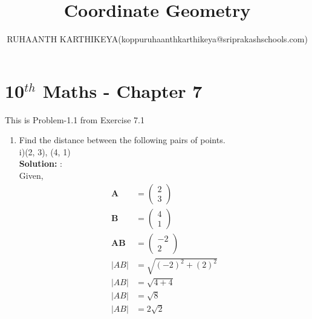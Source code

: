 \documentclass[12pt]{article}
\title{Coordinate Geometry}
\author{RUHAANTH KARTHIKEYA(koppuruhaanthkarthikeya@sriprakashschools.com)}
\newcommand{\myvec}[1]{\ensuremath{\begin{pmatrix}#1\end{pmatrix}}}
\newcommand{\solution}{\noindent \textbf{Solution: }}
\let\vec\mathbf
\begin{document}
\maketitle
\section*{10$^{th}$ Maths - Chapter 7}
This is Problem-1.1 from Exercise 7.1
\begin{enumerate}
\item Find the distance between the following pairs of points.\\
 i)(2, 3), (4, 1) \\
\solution:\\
Given,
\begin{align}
\vec{A}&=\myvec{2\\3}\\
\vec{B}&=\myvec{4\\1}\\
\vec{AB}&=\myvec{-2\\2}\\
|AB|&=\sqrt{(-2)^2+(2)^2}\\
|AB|&=\sqrt{4+4}\\
|AB|&=\sqrt{8}\\
|AB|&=2\sqrt{2}\\
\end{align}
\end{enumerate}
\end{document}
